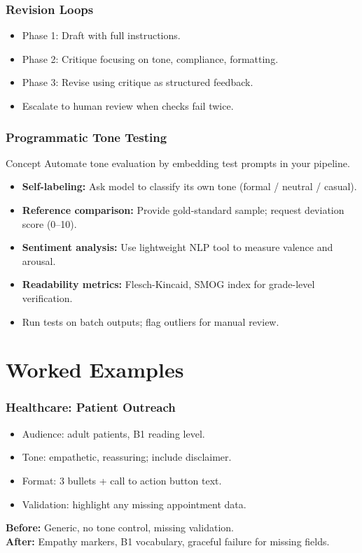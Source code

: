 \documentclass{beamer}
\begin{document}
\begin{frame}
    \frametitle{Revision Loops}
    \begin{itemize}
        \item Phase 1: Draft with full instructions.
        \item Phase 2: Critique focusing on tone, compliance, formatting.
        \item Phase 3: Revise using critique as structured feedback.
        \item Escalate to human review when checks fail twice.
    \end{itemize}
\end{frame}

\begin{frame}
    \frametitle{Programmatic Tone Testing}
    \begin{block}{Concept}
        Automate tone evaluation by embedding test prompts in your pipeline.
    \end{block}
    \begin{itemize}
        \item \textbf{Self-labeling:} Ask model to classify its own tone (formal / neutral / casual).
        \item \textbf{Reference comparison:} Provide gold-standard sample; request deviation score (0--10).
        \item \textbf{Sentiment analysis:} Use lightweight NLP tool to measure valence and arousal.
        \item \textbf{Readability metrics:} Flesch-Kincaid, SMOG index for grade-level verification.
        \item Run tests on batch outputs; flag outliers for manual review.
    \end{itemize}
\end{frame}

\section{Worked Examples}

\begin{frame}
    \frametitle{Healthcare: Patient Outreach}
    \begin{itemize}
        \item Audience: adult patients, B1 reading level.
        \item Tone: empathetic, reassuring; include disclaimer.
        \item Format: 3 bullets + call to action button text.
        \item Validation: highlight any missing appointment data.
    \end{itemize}
    \vspace{0.3cm}
    \textbf{Before:} Generic, no tone control, missing validation.\\
    \textbf{After:} Empathy markers, B1 vocabulary, graceful failure for missing fields.
\end{frame}
\end{document}
